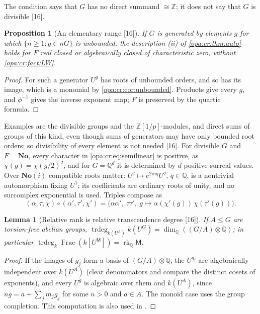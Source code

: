 \documentclass[11pt,oneside]{article}
\numberwithin{equation}{section}
\newtheorem{proposition}[proposition]{Proposition}
\newtheorem{lemma}[lemma]{Lemma}
\theoremstyle{definition}
\theoremstyle{remark}
\newcommand{\No}{\mathbf{No}}
\newcommand{\SC}{\mathbf{No}(i)}
\newcommand{\Q}{\mathbb Q}
\newcommand{\Z}{\mathbb Z}
\newcommand{\Frac}{\operatorname{Frac}}
\newcommand{\trdeg}{\operatorname{trdeg}}
\newcommand{\src}[1]{\textup{\textsf{\small[#1]}}}
\begin{document}
The condition says that $G$ has no direct summand $\cong\Z$; it does not say that $G$ is divisible \src{16}.

\begin{proposition}[An elementary range \src{16}]\label{opa:cr:prop:unboundedgroup}
If $G$ is generated by elements $g$ for which $\{n\ge1:g\in nG\}$ is unbounded, the description (ii) of
\cref{opa:cr:thm:auto} holds for $F$ real closed or algebraically closed of characteristic zero, without \cref{opa:cr:fact:LW}.
\end{proposition}
\begin{proof}
For such a generator $U^g$ has roots of unbounded orders, and so has its image, which is a monomial by
\cref{opa:cr:cor:unbounded}. Products give every $g$, and $\phi^{-1}$ gives the inverse exponent map; $F$ is preserved by the
quartic formula.
\end{proof}

Examples are the divisible groups and the $\Z[1/p]$-modules, and direct sums of groups of this kind, even though sums
of generators may have only bounded root orders; so divisibility of every element is not needed \src{16}. For divisible
$G$ and $F=\No$, every character in \eqref{opa:cr:eq:semilinear} is positive, as $\chi(g)=\chi(g/2)^2$, and for $G=\Q^d$ it is
determined by $d$ positive surreal values. Over $\SC$ compatible roots matter: $U^q\mapsto e^{2\pi iq}U^q$, $q\in\Q$, is a
nontrivial automorphism fixing $U^1$; its coefficients are ordinary roots of unity, and no surcomplex exponential is used.
Triples compose as
\[
 (\alpha,\tau,\chi)\circ(\alpha',\tau',\chi')=\bigl(\alpha\alpha',\ \tau\tau',\ g\mapsto\alpha(\chi'(g))\,\chi(\tau'(g))\bigr).
\]

\begin{lemma}[Relative rank is relative transcendence degree \src{16}]\label{opa:cr:lem:rank}
If $A\le G$ are torsion-free abelian groups, $\trdeg_{k(U^A)}k(U^G)=\dim_\Q((G/A)\otimes\Q)$; in particular
$\trdeg_k\Frac(k[U^{\mathsf M}])=\operatorname{rk}_\Q\mathsf M$.
\end{lemma}
\begin{proof}
If the images of $g_j$ form a basis of $(G/A)\otimes\Q$, the $U^{g_j}$ are algebraically independent over $k(U^A)$ (clear
denominators and compare the distinct cosets of exponents), and every $U^g$ is algebraic over them and $k(U^A)$, since
$ng=a+\sum_jm_jg_j$ for some $n>0$ and $a\in A$. The monoid case uses the group completion. This computation is also used
in \cite{LW}.
\end{proof}
\end{document}
